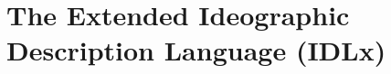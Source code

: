 


\vspace{\myLineheight}\begin{multicols}{2}\raggedcolumns{}

\end{multicols}


\section{The Extended Ideographic Description Language (IDLx)
}


\vspace{\myLineheight}\begin{multicols}{2}\raggedcolumns{}\end{multicols}





